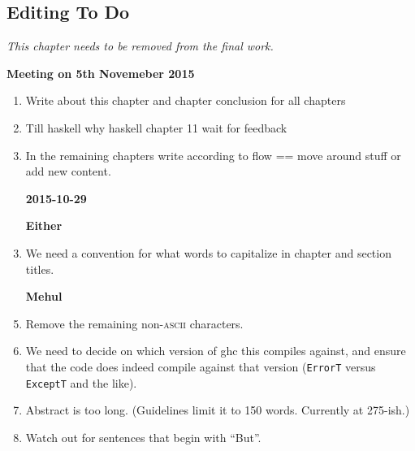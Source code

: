 
\begin{scope}
\nolinenumbers
\chapter{Editing To Do}\label{chap:to-do}

\textit{\color{red} This chapter needs to be removed from the final
  work.}

\textbf{Meeting on 5th Novemeber 2015} 
\begin{enumerate}
\item Write about this chapter and chapter conclusion for all chapters

\item Till haskell why haskell chapter 11 wait for feedback

\item In the remaining chapters write according to flow == move around stuff or add new content.
\end{enumerate}

\begin{enumerate}
\item [\textbf{2015-10-29}]
\item [\textbf{Either}]
\item
  We need a convention for what words to capitalize in chapter and
  section titles.

\item [\textbf{Mehul}]

\item Remove the remaining non-\textsc{ascii} characters.

\item
  We need to decide on which version of ghc this compiles against, and ensure that the code does indeed compile
  against that version (\Verb!ErrorT! versus \Verb!ExceptT! and the like).

\item
  Abstract is too long.  (Guidelines limit it to 150 words.  Currently
  at 275-ish.)

\item
  Watch out for sentences that begin with ``But''.


\end{enumerate}
\end{scope}
